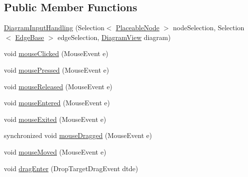 \subsection*{Public Member Functions}
\begin{DoxyCompactItemize}
\item 
\hyperlink{classorg_1_1tzi_1_1use_1_1gui_1_1views_1_1diagrams_1_1event_1_1_diagram_input_handling_a77ecc580f49b5f808967253f26ab6c73}{Diagram\-Input\-Handling} (Selection$<$ \hyperlink{classorg_1_1tzi_1_1use_1_1gui_1_1views_1_1diagrams_1_1elements_1_1_placeable_node}{Placeable\-Node} $>$ node\-Selection, Selection$<$ \hyperlink{classorg_1_1tzi_1_1use_1_1gui_1_1views_1_1diagrams_1_1elements_1_1edges_1_1_edge_base}{Edge\-Base} $>$ edge\-Selection, \hyperlink{classorg_1_1tzi_1_1use_1_1gui_1_1views_1_1diagrams_1_1_diagram_view}{Diagram\-View} diagram)
\item 
void \hyperlink{classorg_1_1tzi_1_1use_1_1gui_1_1views_1_1diagrams_1_1event_1_1_diagram_input_handling_af4346cafe4d280bb0cb3ba3257634976}{mouse\-Clicked} (Mouse\-Event e)
\item 
void \hyperlink{classorg_1_1tzi_1_1use_1_1gui_1_1views_1_1diagrams_1_1event_1_1_diagram_input_handling_a2b8ca1c4716752b57a5eaa2fa7fa9f93}{mouse\-Pressed} (Mouse\-Event e)
\item 
void \hyperlink{classorg_1_1tzi_1_1use_1_1gui_1_1views_1_1diagrams_1_1event_1_1_diagram_input_handling_ae1d83702ece748d9822f98d731cc0dbf}{mouse\-Released} (Mouse\-Event e)
\item 
void \hyperlink{classorg_1_1tzi_1_1use_1_1gui_1_1views_1_1diagrams_1_1event_1_1_diagram_input_handling_a24047b82644ad7546908642bda9a78b8}{mouse\-Entered} (Mouse\-Event e)
\item 
void \hyperlink{classorg_1_1tzi_1_1use_1_1gui_1_1views_1_1diagrams_1_1event_1_1_diagram_input_handling_a87f8833c3268b717576a7718b7e21728}{mouse\-Exited} (Mouse\-Event e)
\item 
synchronized void \hyperlink{classorg_1_1tzi_1_1use_1_1gui_1_1views_1_1diagrams_1_1event_1_1_diagram_input_handling_a60f0e7a30dc93d239f16486d230da3c2}{mouse\-Dragged} (Mouse\-Event e)
\item 
void \hyperlink{classorg_1_1tzi_1_1use_1_1gui_1_1views_1_1diagrams_1_1event_1_1_diagram_input_handling_a56a1e39794cc49d9ace8fd46c23bc677}{mouse\-Moved} (Mouse\-Event e)
\item 
void \hyperlink{classorg_1_1tzi_1_1use_1_1gui_1_1views_1_1diagrams_1_1event_1_1_diagram_input_handling_ad42ad934675ec14f336200a4daf5d58e}{drag\-Enter} (Drop\-Target\-Drag\-Event dtde)

\end{DoxyCompactItemize}
